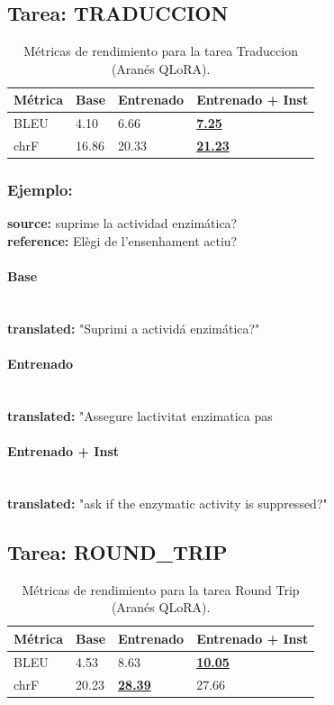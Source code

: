 \subsection{Tarea: TRADUCCION}\label{tarea-traduccion}
\begin{longtable}[]{@{}llll@{}}
\toprule\noalign{}
Métrica & Base & Entrenado & Entrenado + Inst \\
\midrule\noalign{}
\endhead
\bottomrule\noalign{}
\caption{Métricas de rendimiento para la tarea Traduccion (Aranés QLoRA).}
\label{tab:metricas_traduccion_Aranés QLoRA}
\endlastfoot
BLEU & 4.10 & 6.66 & \textbf{\underline{7.25}} \\
chrF & 16.86 & 20.33 & \textbf{\underline{21.23}} \\
\end{longtable}

\subsubsection{Ejemplo:}
\textbf{source:} suprime la actividad enzimática?\\
\textbf{reference:} Elègi de l’ensenhament actiu?

\paragraph{Base}~\\
\textbf{translated:} "Suprimi a actividá enzimática?"

\paragraph{Entrenado}~\\
\textbf{translated:} "Assegure l\textquotesingle{}activitat enzimatica pas

\paragraph{Entrenado + Inst}~\\
\textbf{translated:} "ask if the enzymatic activity is suppressed?"

\subsection{Tarea: ROUND\_TRIP}\label{tarea-round_trip}
\begin{longtable}[]{@{}llll@{}}
\toprule\noalign{}
Métrica & Base & Entrenado & Entrenado + Inst \\
\midrule\noalign{}
\endhead
\bottomrule\noalign{}
\caption{Métricas de rendimiento para la tarea Round Trip (Aranés QLoRA).}
\label{tab:metricas_round_trip_Aranés QLoRA}
\endlastfoot
BLEU & 4.53 & 8.63 & \textbf{\underline{10.05}} \\
chrF & 20.23 & \textbf{\underline{28.39}} & 27.66 \\
\end{longtable}

